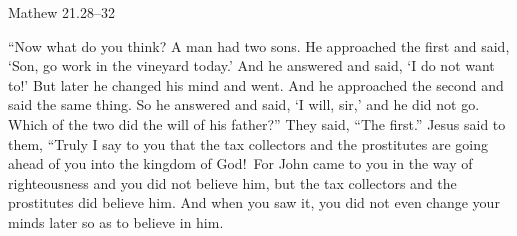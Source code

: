 \documentclass[
]{article}
\newcommand{\RL}[1]{\beginR #1\endR}
\begin{document}
Mathew 21.28--32

\RL{``}Now what do you think? A man had two sons. He approached the
first and said, \RL{`}Son, go work in the vineyard today.\RL{'} And he
answered and said, \RL{`}I do not want to!\RL{'} But later he changed
his mind and went. And he approached the second and said the same thing.
So he answered and said, \RL{`}I will, sir,\RL{'} and he did not go.
Which of the two did the will of his father?'' They said, \RL{``}The
first.'' Jesus said to them, \RL{``}Truly I say to you that the tax
collectors and the prostitutes are going ahead of you into the kingdom
of God!~For John came to you in the way of righteousness and you did not
believe him, but the tax collectors and the prostitutes did believe him.
And when you saw it, you did not even change your minds later so as to
believe in him.
\end{document}
